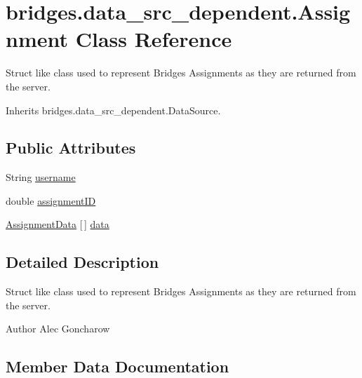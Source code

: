 \hypertarget{classbridges_1_1data__src__dependent_1_1_assignment}{}\section{bridges.\+data\+\_\+src\+\_\+dependent.\+Assignment Class Reference}
\label{classbridges_1_1data__src__dependent_1_1_assignment}


Struct like class used to represent Bridges Assignments as they are returned from the server.  




Inherits bridges.\+data\+\_\+src\+\_\+dependent.\+Data\+Source.

\subsection*{Public Attributes}
\begin{DoxyCompactItemize}
\item 
String \mbox{\hyperlink{classbridges_1_1data__src__dependent_1_1_assignment_aa7326ba8e0eb02fff4e5b22e4b89e61d}{username}}
\item 
double \mbox{\hyperlink{classbridges_1_1data__src__dependent_1_1_assignment_a88c98da9e5ba6f8d83326d6fbae659d8}{assignment\+ID}}
\item 
\mbox{\hyperlink{classbridges_1_1data__src__dependent_1_1_assignment_data}{Assignment\+Data}} \mbox{[}$\,$\mbox{]} \mbox{\hyperlink{classbridges_1_1data__src__dependent_1_1_assignment_a23d503c5e6eae939bb8262dc8e18c259}{data}}
\end{DoxyCompactItemize}


\subsection{Detailed Description}
Struct like class used to represent Bridges Assignments as they are returned from the server. 

\begin{DoxyAuthor}{Author}
Alec Goncharow 
\end{DoxyAuthor}


\subsection{Member Data Documentation}
\mbox{\label{classbridges_1_1data__src__dependent_1_1_assignment_a88c98da9e5ba6f8d83326d6fbae659d8}} 
